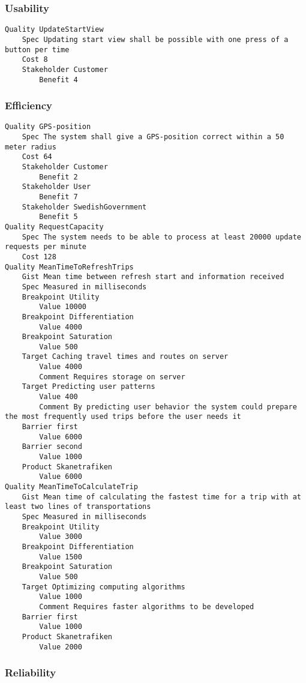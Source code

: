 \begin{lstlisting}

\end{lstlisting}


			 \subsubsection{Usability}


\begin{lstlisting}
Quality UpdateStartView
	Spec Updating start view shall be possible with one press of a button per time
	Cost 8
	Stakeholder Customer
		Benefit 4

\end{lstlisting}
		
				
			 \subsubsection{Efficiency}


\begin{lstlisting}
Quality GPS-position
	Spec The system shall give a GPS-position correct within a 50 meter radius
	Cost 64
	Stakeholder Customer
		Benefit 2
	Stakeholder User
		Benefit 7
	Stakeholder SwedishGovernment
		Benefit 5
Quality RequestCapacity
	Spec The system needs to be able to process at least 20000 update requests per minute
	Cost 128
Quality MeanTimeToRefreshTrips
	Gist Mean time between refresh start and information received
	Spec Measured in milliseconds
	Breakpoint Utility
		Value 10000
	Breakpoint Differentiation
		Value 4000
	Breakpoint Saturation
		Value 500
	Target Caching travel times and routes on server
		Value 4000
		Comment Requires storage on server
	Target Predicting user patterns
		Value 400
		Comment By predicting user behavior the system could prepare the most frequently used trips before the user needs it
	Barrier first
		Value 6000
	Barrier second
		Value 1000
	Product Skanetrafiken
		Value 6000
Quality MeanTimeToCalculateTrip
	Gist Mean time of calculating the fastest time for a trip with at least two lines of transportations
	Spec Measured in milliseconds
	Breakpoint Utility
		Value 3000
	Breakpoint Differentiation
		Value 1500
	Breakpoint Saturation
		Value 500
	Target Optimizing computing algorithms
		Value 1000
		Comment Requires faster algorithms to be developed
	Barrier first
		Value 1000
	Product Skanetrafiken
		Value 2000

\end{lstlisting}
		
				
			 \subsubsection{Reliability}


